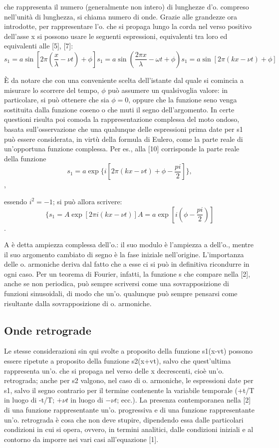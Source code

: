 \documentclass[a4paper]{article}
\begin{document}
che rappresenta il numero (generalmente non intero) di lunghezze d'o. compreso nell'unità di lunghezza, si chiama numero di onde. Grazie alle grandezze ora introdotte, per rappresentare l'o. che si propaga lungo la corda nel verso positivo dell'asse x si possono usare le seguenti espressioni, equivalenti tra loro ed equivalenti alle [5], [7]: 
\begin{equation}
s_1=a\sin[2\pi(\frac{x}{\lambda}-\nu t)+\phi]
s_1=a\sin(\frac{2\pi x}{\lambda}-\omega t+\phi)
s_1=a\sin[2\pi(kx-\nu t)+\phi]
\end{equation}

È da notare che con una conveniente scelta dell'istante dal quale si comincia a misurare lo scorrere del tempo, $\phi$ può assumere un qualsivoglia valore: in particolare, si può ottenere che sia $\phi=0$, oppure che la funzione seno venga sostituita dalla funzione coseno o che muti il segno dell'argomento. In certe questioni risulta poi comoda la rappresentazione complessa del moto ondoso, basata sull'osservazione che una qualunque delle espressioni prima date per s1 può essere considerata, in virtù della formula di Eulero, come la parte reale di un'opportuna funzione complessa. Per es., alla [10] corrisponde la parte reale della funzione 
\begin{equation}
s_1=a\exp\{i[2\pi(kx-\nu t)+\phi-\frac{pi}{2}]\},
\end{equation},

essendo $i^2=-1$; si può allora scrivere:
\begin{equation}
\{s_1=A\exp[2\pi i(kx-\nu t)]
A=a\exp[i(\phi-\frac{pi}{2})]
\end{equation}.

A è detta ampiezza complessa dell'o.: il suo modulo è l'ampiezza a dell'o., mentre il suo argomento cambiato di segno è la fase iniziale nell'origine. L'importanza delle o. armoniche deriva dal fatto che a esse ci si può in definitiva ricondurre in ogni caso. Per un teorema di Fourier, infatti, la funzione s che compare nella [2], anche se non periodica, può sempre scriversi come una sovrapposizione di funzioni sinusoidali, di modo che un'o. qualunque può sempre pensarsi come risultante dalla sovrapposizione di o. armoniche. 

\subsection{Onde retrograde}
Le stesse considerazioni sin qui svolte a proposito della funzione s1(x-vt) possono essere ripetute a proposito della funzione s2(x+vt), salvo che quest'ultima rappresenta un'o. che si propaga nel verso delle x decrescenti, cioè un'o. retrograda; anche per s2 valgono, nel caso di o. armoniche, le espressioni date per s1, salvo il segno contrario per il termine contenente la variabile temporale (+t/T in luogo di -t/T; $+\nu t$ in luogo di $-\nu t$; ecc.). La presenza contemporanea nella [2] di una funzione rappresentante un'o. progressiva e di una funzione rappresentante un'o. retrograda è cosa che non deve stupire, dipendendo essa dalle particolari condizioni in cui si opera, ovvero, in termini analitici, dalle condizioni iniziali e al contorno da imporre nei vari casi all'equazione [1]. 
\end{document}
